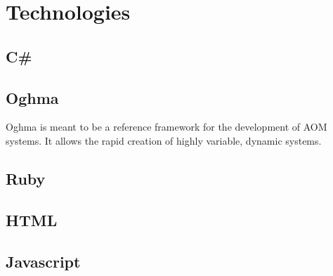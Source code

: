 \chapter{Technologies}\label{chap:technologies}

\section{C\#}\label{sec:csharp}

\section{Oghma}\label{sec:oghma}


Oghma is meant to be a reference framework for the development of AOM systems. It allows the rapid creation of highly variable, dynamic systems.

\section{Ruby}\label{sec:technologies:ruby}

\section{HTML}\label{sec:html}

\section{Javascript}\label{sec:javascript}

